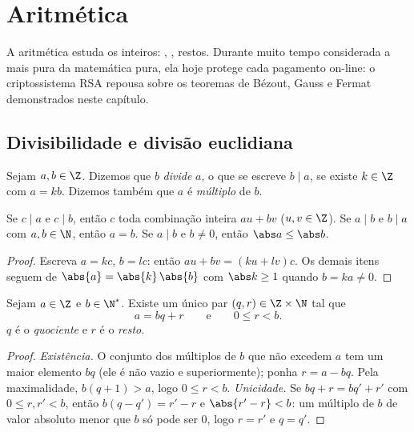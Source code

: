 \chapter{Aritmética}\label{ch:g12:arith}

A aritmética estuda os inteiros: , , restos.
Durante muito tempo considerada a mais pura da matemática pura, ela hoje
protege cada pagamento on-line: o criptossistema RSA repousa sobre os
teoremas de Bézout, Gauss e Fermat demonstrados neste capítulo.

\section{Divisibilidade e divisão euclidiana}

\begin{definition}[Divisibilidade]\label{def:g12:arith:divides}
Sejam $a, b \in \Z$. Dizemos que $b$ \emph{divide}
$a$, o que se escreve $b \mid a$, se existe
$k \in \Z$ com $a = kb$. Dizemos também que $a$ é \emph{múltiplo} de $b$.
\end{definition}

\begin{proposition}\label{prop:g12:arith:divprops}
Se $c \mid a$ e $c \mid b$, então $c$  toda combinação inteira
$au + bv$ ($u, v \in \Z$). Se $a \mid b$ e $b \mid a$ com $a,b \in \N$,
então $a = b$. Se $a \mid b$ e $b \neq 0$, então $\abs a \leq \abs b$.
\end{proposition}

\begin{proof}
Escreva $a = kc$, $b = lc$: então $au + bv = (ku + lv)c$. Os demais itens
seguem de $\abs{a} = \abs{k}\,\abs{b}$ com $\abs k \geq 1$ quando
$b = ka \neq 0$.
\end{proof}

\begin{theorem}\label{thm:g12:arith:euclid}
Sejam $a \in \Z$ e $b \in \N^*$. Existe um único par
$(q, r) \in \Z \times \N$ tal que
\[
a = bq + r \qquad\text{e}\qquad 0 \leq r < b .
\]
$q$ é o \emph{quociente} e $r$ é o \emph{resto}.
\end{theorem}

\begin{proof}
\emph{Existência.} O conjunto dos múltiplos de $b$ que não excedem $a$ tem
um maior elemento $bq$ (ele é não vazio e  superiormente); ponha
$r = a - bq$. Pela maximalidade, $b(q+1) > a$, logo $0 \leq r < b$.
\emph{Unicidade.} Se $bq + r = bq' + r'$ com $0 \leq r, r' < b$, então
$b(q - q') = r' - r$ e $\abs{r' - r} < b$: um múltiplo de $b$ de valor
absoluto menor que $b$ só pode ser $0$, logo $r = r'$ e $q = q'$.
\end{proof}

